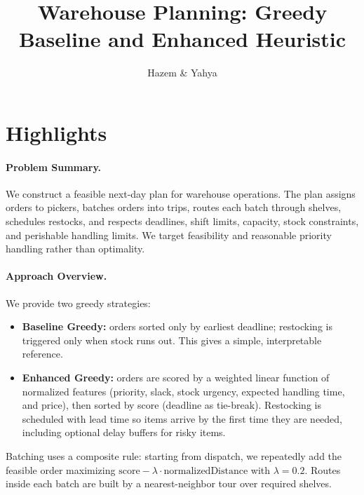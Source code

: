 \documentclass[11pt]{article}
\title{Warehouse Planning: Greedy Baseline and Enhanced Heuristic}
\author{Hazem \& Yahya}
\date{}
\begin{document}
\maketitle

\section*{Highlights}
\paragraph{Problem Summary.}
We construct a feasible next-day plan for warehouse operations. The plan assigns orders to pickers, batches orders into trips, routes each batch through shelves, schedules restocks, and respects deadlines, shift limits, capacity, stock constraints, and perishable handling limits. We target feasibility and reasonable priority handling rather than optimality.

\paragraph{Approach Overview.}
We provide two greedy strategies:
\begin{itemize}[leftmargin=1.25em]
    \item \textbf{Baseline Greedy:} orders sorted only by earliest deadline; restocking is triggered only when stock runs out. This gives a simple, interpretable reference.
    \item \textbf{Enhanced Greedy:} orders are scored by a weighted linear function of normalized features (priority, slack, stock urgency, expected handling time, and price), then sorted by score (deadline as tie-break). Restocking is scheduled with lead time so items arrive by the first time they are needed, including optional delay buffers for risky items.
\end{itemize}
Batching uses a composite rule: starting from dispatch, we repeatedly add the feasible order maximizing $\text{score} - \lambda \cdot \text{normalizedDistance}$ with $\lambda=0.2$. Routes inside each batch are built by a nearest-neighbor tour over required shelves.
\end{document}
